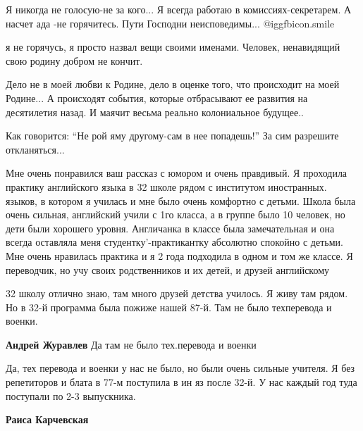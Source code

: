 \begin{itemize}
\begin{itemize}

Я никогда не голосую-не за кого... Я всегда работаю в комиссиях-секретарем. А
насчет ада -не горячитесь. Пути Господни неисповедимы... @igg{fbicon.smile} 


я не горячусь, я просто назвал вещи своими именами. Человек, ненавидящий свою
родину добром не кончит.


Дело не в моей любви к Родине, дело в оценке того, что происходит на моей
Родине... А происходят события, которые отбрасывают ее развития на десятилетия
назад. И маячит весьма реально колониальное будущее..


Как говорится: \enquote{Не рой яму другому-сам в нее попадешь!} За сим
разрешите откланяться...

\end{itemize} %


Мне очень понравился ваш рассказ с юмором и очень правдивый. Я проходила
практику английского языка в 32 школе рядом с институтом иностранных. языков, в
котором я училась и мне было очень комфортно с детьми. Школа была очень
сильная, английский учили с 1го класса, а в группе было 10 человек, но дети были
хорошего уровня. Англичанка в классе была замечательная и она всегда оставляла
меня студентку'-практикантку абсолютно спокойно с детьми. Мне очень нравилась
практика и я 2 года подходила в одном и том же классе. Я переводчик, но учу
своих родственников и их детей, и друзей английскому

\begin{itemize} %

32 школу отлично знаю, там много друзей детства училось. Я живу там рядом. Но в
32-й программа была пожиже нашей 87-й. Там не было техперевода и военки.


\textbf{Андрей Журавлев} Да там не было тех.перевода и военки


Да, тех перевода и военки у нас не было, но были очень сильные учителя. Я без
репетиторов и блата в 77-м поступила в ин яз после 32-й. У нас каждый год туда
поступали по 2-3 выпускника.

\textbf{Раиса Карчевская} 


\end{itemize}
\end{itemize}
